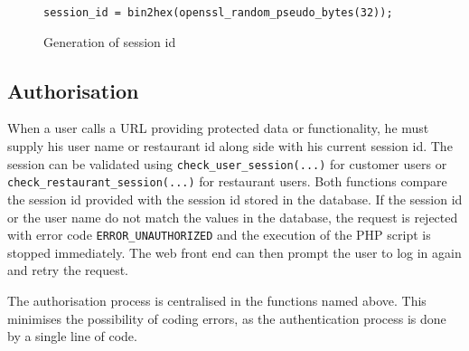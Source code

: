 \begin{figure}
\lstset{language=php}
\begin{lstlisting}
session_id = bin2hex(openssl_random_pseudo_bytes(32));
\end{lstlisting}
\caption{Generation of session id}
\label{security_session_id}
\end{figure}

\subsection{Authorisation}
When a user calls a URL providing protected data or functionality, he must supply his user name or restaurant id along side with his current session id. The session can be validated using \texttt{check\_user\_session(...)} for customer users or \texttt{check\_restaurant\_session(...)} for restaurant users. Both functions compare the session id provided with the session id stored in the database. If the session id or the user name do not match the values in the database, the request is rejected with error code \texttt{ERROR\_UNAUTHORIZED} and the execution of the PHP script is stopped immediately. The web front end can then prompt the user to log in again and retry the request.

The authorisation process is centralised in the functions named above. This minimises the possibility of coding errors, as the authentication process is done by a single line of code.
